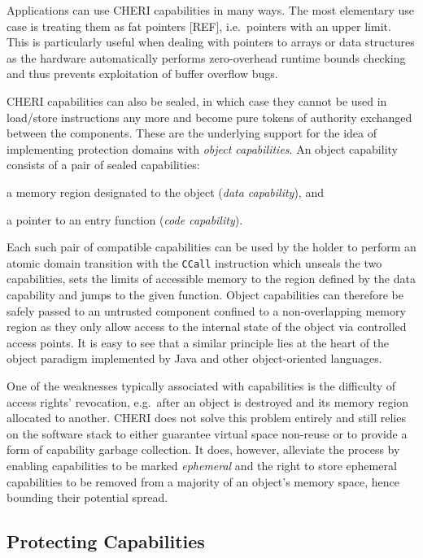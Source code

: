\documentclass[a4paper,12pt,twoside,openright]{report}
\newcommand{\insn}[1]{\texttt{#1}}
\begin{document}
Applications can use CHERI capabilities in many ways. The most elementary use case is treating them as fat pointers [REF], i.e.\ pointers with an upper limit. This is particularly useful when dealing with pointers to arrays or data structures as the hardware automatically performs zero-overhead runtime bounds checking and thus prevents exploitation of buffer overflow bugs. 

CHERI capabilities can also be sealed, in which case they cannot be used in load/store instructions any more and become pure tokens of authority exchanged between the components. These are the underlying support for the idea of implementing protection domains with \emph{object capabilities}. An object capability consists of a pair of sealed capabilities: 
\begin{inparaenum}
\item a memory region designated to the object (\emph{data capability}), and
\item a pointer to an entry function (\emph{code capability}).
\end{inparaenum}
Each such pair of compatible capabilities can be used by the holder to perform an atomic domain transition with the \insn{CCall} instruction which unseals the two capabilities, sets the limits of accessible memory to the region defined by the data capability and jumps to the given function. Object capabilities can therefore be safely passed to an untrusted component confined to a non-overlapping memory region as they only allow access to the internal state of the object via controlled access points. It is easy to see that a similar principle lies at the heart of the object paradigm implemented by Java and other object-oriented languages.

One of the weaknesses typically associated with capabilities is the difficulty of access rights' revocation, e.g.\ after an object is destroyed and its memory region allocated to another. CHERI does not solve this problem entirely and still relies on the software stack to either guarantee virtual space non-reuse or to provide a form of capability garbage collection. It does, however, alleviate the process by enabling capabilities to be marked \emph{ephemeral} and the right to store ephemeral capabilities to be removed from a majority of an object's memory space, hence bounding their potential spread.

\subsection{Protecting Capabilities}
\end{document}
